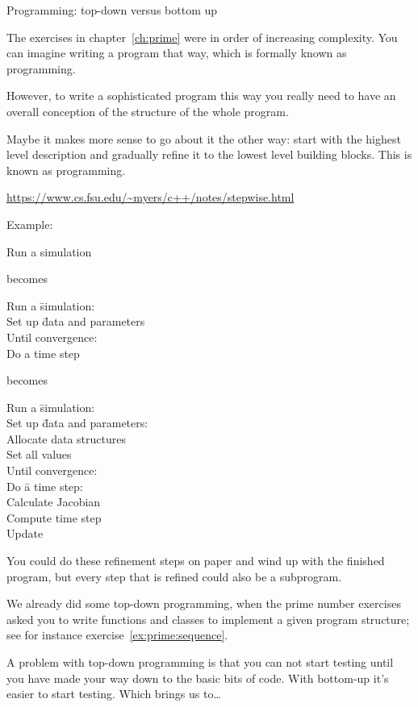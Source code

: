  {Programming: top-down versus bottom up}

The exercises in chapter~\ref{ch:prime} were in order of increasing
complexity. You can imagine writing a program that way, which is
formally known as  programming.

However, to write a sophisticated program this way you really need to
have an overall conception of the structure of the whole
program.

Maybe it makes more sense to go about it the other way: start with the
highest level description and gradually refine it to the lowest level
building blocks. This is known as  programming.

\url{https://www.cs.fsu.edu/~myers/c++/notes/stepwise.html}

Example:\\
\begin{tabbing}
  Run a simulation
\end{tabbing}
becomes
\begin{tabbing}
  Run a \=simulation:\\
  \>Set up \=data and parameters\\
  \>Until convergence:\\
  \>\>Do a time step
\end{tabbing}
becomes
\begin{tabbing}
  Run a \=simulation:\\
  \>Set up \=data and parameters:\\
  \>\>Allocate data structures\\
  \>\>Set all values\\
  \>Until convergence:\\
  \>\>Do \=a time step:\\
  \>\>\>Calculate Jacobian\\
  \>\>\>Compute time step\\
  \>\>\>Update
\end{tabbing}

You could do these refinement steps on paper and wind up with the
finished program, but every step that is refined could also be a
subprogram.

We already did some top-down programming, when the prime number
exercises asked you to write functions and classes to implement a
given program structure; see for instance exercise~\ref{ex:prime:sequence}.

A problem with top-down programming is that you can not start testing
until you have made your way down to the basic bits of code. With
bottom-up it's easier to start testing. Which brings us to\ldots

